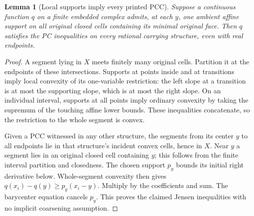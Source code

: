 \documentclass[11pt]{article}
\newtheorem{lemma}[theorem]{Lemma}
\begin{document}
\begin{lemma}[Local supports imply every printed PCC]\label{lem:local}
Suppose a continuous function $q$ on a finite embedded complex admits, at each $y$, one ambient affine support on all original closed cells containing its minimal original face. Then $q$ satisfies the PC inequalities on every rational carrying structure, even with real endpoints.
\end{lemma}
\begin{proof}
A segment lying in $X$ meets finitely many original cells. Partition it at the endpoints of these intersections. Supports at points inside and at transitions imply local convexity of its one-variable restriction: the left slope at a transition is at most the supporting slope, which is at most the right slope. On an individual interval, supports at all points imply ordinary convexity by taking the supremum of the touching affine lower bounds. These inequalities concatenate, so the restriction to the whole segment is convex.

Given a PCC witnessed in any other structure, the segments from its center $y$ to all endpoints lie in that structure's incident convex cells, hence in $X$. Near $y$ a segment lies in an original closed cell containing $y$; this follows from the finite interval partition and closedness. The chosen support $p_y$ bounds its initial right derivative below. Whole-segment convexity then gives $q(x_i)-q(y)\geq p_y(x_i-y)$. Multiply by the coefficients and sum. The barycenter equation cancels $p_y$. This proves the claimed Jensen inequalities with no implicit coarsening assumption.
\end{proof}
\end{document}
